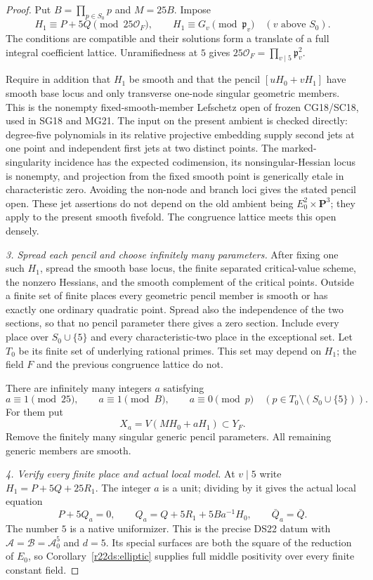 \begin{proof}
Put $B=\prod_{p\in S_0}p$ and $M=25B$.  Impose
\[
 H_1\equiv P+5Q\pmod{25\mathcal O_F},\qquad
 H_1\equiv G_v\pmod{\mathfrak p_v}\quad(v\text{ above }S_0).
 \tag{DG22.7}\label{r22dg:H1}
\]
The conditions are compatible and their solutions form a translate
of a full integral coefficient lattice.  Unramifiedness at $5$
gives $25\mathcal O_F=\prod_{v\mid5}\mathfrak p_v^2$.

Require in addition that $H_1$ be smooth and that the pencil
$[uH_0+vH_1]$ have smooth base locus and only transverse one-node
singular geometric members.  This is the nonempty fixed-smooth-member
Lefschetz open of frozen CG18/SC18, used in SG18 and MG21.
The input on the present ambient is checked directly: degree-five
polynomials in its relative projective embedding supply second
jets at one point and independent first jets at two distinct
points.  The marked-singularity incidence has the expected
codimension, its nonsingular-Hessian locus is nonempty, and
projection from the fixed smooth point is generically etale in
characteristic zero.  Avoiding the non-node and branch loci gives
the stated pencil open.  These jet assertions do not depend on
the old ambient being $E_0^2\times\mathbf P^3$; they apply to
the present smooth fivefold.  The congruence lattice meets this
open densely.

\emph{3. Spread each pencil and choose infinitely many parameters.}
After fixing one such $H_1$, spread the smooth base locus, the
finite separated critical-value scheme, the nonzero Hessians, and
the smooth complement of the critical points.  Outside a finite
set of finite places every geometric pencil member is smooth or
has exactly one ordinary quadratic point.  Spread also the
independence of the two sections, so that no pencil parameter
there gives a zero section.  Include every place over
$S_0\cup\{5\}$ and every characteristic-two place in the
exceptional set.  Let $T_0$ be its finite set of underlying
rational primes.  This set may depend on $H_1$; the field $F$
and the previous congruence lattice do not.

There are infinitely many integers $a$ satisfying
\[
 a\equiv1\pmod{25},\qquad a\equiv1\pmod B,\qquad
 a\equiv0\pmod p\quad
                (p\in T_0\setminus(S_0\cup\{5\})).
 \tag{DG22.8}\label{r22dg:a}
\]
For them put
\[
                          X_a=V(MH_0+aH_1)\subset Y_F.
 \tag{DG22.9}\label{r22dg:Xa}
\]
Remove the finitely many singular generic pencil parameters.
All remaining generic members are smooth.

\emph{4. Verify every finite place and actual local model.}
At $v\mid5$ write $H_1=P+5Q+25R_1$.  The integer $a$ is a
unit; dividing by it gives the actual local equation
\[
 P+5Q_a=0,\qquad
 Q_a=Q+5R_1+5B a^{-1}H_0,\qquad \bar Q_a=\bar Q.
 \tag{DG22.10}\label{r22dg:local}
\]
The number $5$ is a native uniformizer.  This is the precise
DS22 datum with $\mathcal A=\mathcal B=\mathcal A_0^5$ and
$d=5$.  Its special surfaces are both the square of the reduction
of $E_0$, so Corollary~\ref{r22ds:elliptic} supplies full middle
positivity over every finite constant field.


\end{proof}
